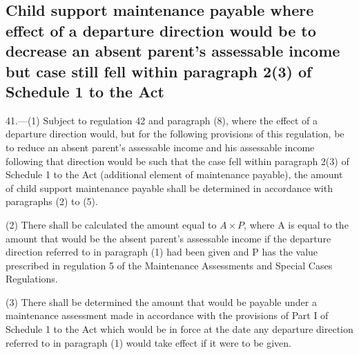 \documentclass[12pt,a4paper]{article}
\begin{document}
\renewcommand\parthead{--- Part IX}

\subsection[41. Child support maintenance payable where effect of a departure direction
would be to decrease an absent parent’s assessable income but case still fell
within paragraph 2(3) of Schedule 1 to the Act]{Child support maintenance payable where effect of a departure direction
would be to decrease an absent parent’s assessable income but case still fell
within paragraph 2(3) of Schedule 1 to the Act}

41.—(1) Subject to regulation 42
and paragraph (8), where the effect of a departure direction would, but for the
following provisions of this regulation, be to reduce an absent parent’s
assessable income and his assessable income following that direction would be
such that the case fell within paragraph 2(3) of Schedule 1 to the Act
(additional element of maintenance payable), the amount of child support
maintenance payable shall be determined in accordance with paragraphs (2) to
(5).

(2) There shall be calculated the amount equal to \(A \times P\), where A is equal to the
amount that would be the absent parent’s assessable income if the departure
direction referred to in paragraph (1) had been given and P has the value
prescribed in regulation 5 of the Maintenance Assessments and Special Cases
Regulations.


(3) There shall be determined the amount that would be payable under a maintenance assessment made in accordance with the provisions of Part I of Schedule 1 to the Act which would be in force at the date any departure direction referred to in paragraph (1) would take effect if it were to be given.

\end{document}
